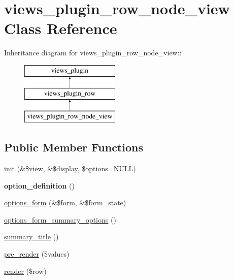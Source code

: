 \hypertarget{classviews__plugin__row__node__view}{
\section{views\_\-plugin\_\-row\_\-node\_\-view Class Reference}
\label{classviews__plugin__row__node__view}
}
Inheritance diagram for views\_\-plugin\_\-row\_\-node\_\-view::\begin{figure}[H]
\begin{center}
\leavevmode
\includegraphics[height=3cm]{classviews__plugin__row__node__view}
\end{center}
\end{figure}
\subsection*{Public Member Functions}
\begin{DoxyCompactItemize}
\item 
\hyperlink{classviews__plugin__row__node__view_a3bb6fb204cefdab520d24765a8f916ba}{init} (\&\$\hyperlink{classview}{view}, \&\$display, \$options=NULL)
\item 
\hypertarget{classviews__plugin__row__node__view_af489a0ff40c6b85382d9611cce0c509b}{
{\bfseries option\_\-definition} ()}
\label{classviews__plugin__row__node__view_af489a0ff40c6b85382d9611cce0c509b}

\item 
\hyperlink{classviews__plugin__row__node__view_a7bc31b38a1cc4474695af3a564fde775}{options\_\-form} (\&\$form, \&\$form\_\-state)
\item 
\hyperlink{classviews__plugin__row__node__view_a36ec9ec1547dae456e8669de4b5625ce}{options\_\-form\_\-summary\_\-options} ()
\item 
\hyperlink{classviews__plugin__row__node__view_a64b0c17198744b817ca0246e0d973aad}{summary\_\-title} ()
\item 
\hyperlink{classviews__plugin__row__node__view_a5a6428b6994ff8c0ff52e1e9022fc8eb}{pre\_\-render} (\$values)
\item 
\hyperlink{classviews__plugin__row__node__view_a54c188103326e10c26a466d896e6d74b}{render} (\$row)
\end{DoxyCompactItemize}
